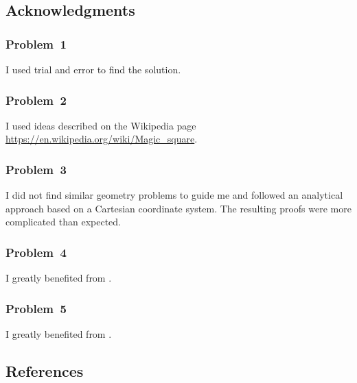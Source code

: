 
\newpage\clearpage
\subsection*{Acknowledgments}

\subsubsection*{Problem~1}
I used trial and error to find the solution.

\subsubsection*{Problem~2}
I used ideas described on the Wikipedia page
\newline 
\url{https://en.wikipedia.org/wiki/Magic_square}. 

\subsubsection*{Problem~3}
I did not find similar geometry problems to guide me and followed an analytical approach based on a Cartesian coordinate system. The resulting proofs were more complicated than expected. 

\subsubsection*{Problem~4}
I greatly benefited from \cite{aops:1983}.

\subsubsection*{Problem~5}
I greatly benefited from \cite{j23:2013}.

\subsection*{References}
\printbibliography
